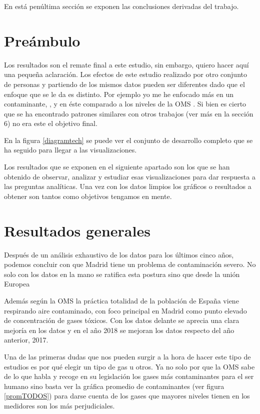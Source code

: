 
En está penúltima sección se exponen las conclusiones derivadas del trabajo. 



\section{Preámbulo}
Los resultados son el remate final a este estudio, sin embargo, quiero hacer aquí una pequeña aclaración. Los efectos de este estudio realizado por otro conjunto de personas y partiendo de los mismos datos pueden ser diferentes dado que el enfoque que se le da es distinto. Por ejemplo yo me he enfocado más en un contaminante, , y en éste comparado a los niveles de la OMS \cite{oms_2}. Si bien es cierto que se ha encontrado patrones similares con otros trabajos (ver más en la sección 6) no era este el objetivo final. 

En la figura \ref{diagramtech} se puede ver el conjunto de desarrollo completo que se ha seguido para llegar a las visualizaciones.

  
  Los resultados que se exponen en el siguiente apartado son los que se han obtenido de observar, analizar y estudiar esas visualizaciones para dar respuesta a las preguntas analíticas. Una vez con los datos limpios los gráficos o resultados a obtener son tantos como objetivos tengamos en mente.
  

\section{Resultados generales}

Después de un análisis exhaustivo de los datos para los últimos cinco años, podemos concluir con que Madrid tiene un problema de contaminación severo. No solo con los datos en la mano se ratifica esta postura sino que desde la unión Europea 

Además según la OMS la práctica totalidad de la población de España viene respirando aire contaminado, con foco principal en Madrid como punto elevado de concentración de gases tóxicos. Con los datos delante se aprecia una clara mejoría en los datos y en el año 2018 se mejoran los datos respecto del año anterior, 2017.

Una de las primeras dudas que nos pueden surgir a la hora de hacer este tipo de estudios es por qué elegir un tipo de gas u otros. Ya no solo por que la OMS sabe de lo que habla y recoge en su legislación los gases más contaminantes para el ser humano sino basta ver la gráfica promedio de contaminantes (ver figura \ref{promTODOS}) para darse cuenta de los gases que mayores niveles tienen en los medidores son los más perjudiciales.


